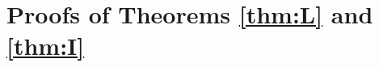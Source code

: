 \documentclass[12pt,a4paper]{amsart}
\numberwithin{equation}{section}
\theoremstyle{plain}
\newtheorem{lem}[thm]{Lemma}
\theoremstyle{definition}
\theoremstyle{remark}
\begin{document}
\section{Proofs of Theorems \ref{thm:L} and \ref{thm:I}}

\begin{comment}
The following lemma is \cite[Proposition 1.4]{LiuRenSongSun2020}.
\begin{lem}\label{lem:rate}
	Suppose that Assumptions \eqref{asp:H1}, \eqref{asp:H2} and \eqref{asp:H3} hold.
Let $(V_t)_{t\ge0}$ be the extended operators defined above on  $\mathcal B(E,[0,\infty])$.
Then
\[
\lim_{t\to\infty}\sup_{x\in E, f\in \mathcal B(E,[0,\infty]) }\left|\dfrac{V_tf(x)}{\phi(x)\nu(V_tf)}-1\right|=0.
\]
\end{lem}

\begin{lem}\label{lem:extinc}
	Suppose that Assumptions \eqref{asp:H1}, \eqref{asp:H2} and \eqref{asp:H3} hold.
\begin{enumerate}
\item	
	For any  $ t>0$ and $ \mu \in \mathcal M_f(E)$, $\langle v(t,\cdot),\mu\rangle <\infty.$
\item	For any $\mu \in \mathcal M_f(E)$,
\[
	\lim_{t\rightarrow\infty}\langle v(t,\cdot),\mu\rangle=0.
\]
\end{enumerate}
\end{lem}


\begin{lem}\label{lem:ratio limit}
(1) For any $f\in\mathcal B(E,[0,\infty])$ with $\nu(f)>0$, and any $s>0$,
\begin{equation}\label{integ ratio limit}
\lim_{t\to\infty}\dfrac{\langle V_{t+s}f, \nu\rangle}{\langle V_{t}f, \nu\rangle}=e^{\lambda s}.
\end{equation}
(2) There are constants $a,N,T>0$ such that
\begin{equation}\label{inequ:lower}
\langle V_{t}f, \nu\rangle\geq ae^{-Nt},\quad \mbox{for any }\ t>T.
\end{equation}
(3) For each $s\geq 0$,
\begin{equation} \label{one point ratio limit}
	\lim_{t\to \infty} \sup_{x\in E}\Big|\frac{v(t+s,x)}{\langle v(t,\cdot),\nu\rangle\phi(x) } - e^{\lambda s} \Big|=0.
\end{equation}
\end{lem}



\end{comment}
\end{document}
